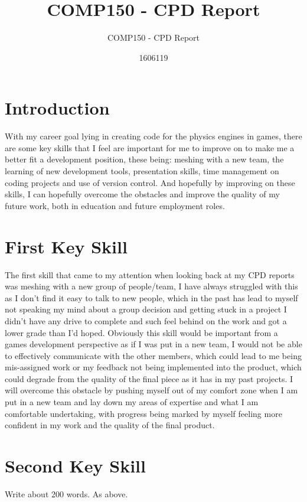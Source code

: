 \documentclass{scrartcl}
\title{COMP150 - CPD Report}
\subtitle{COMP150 - CPD Report}
\author{1606119}
\begin{document}
\maketitle

\section{Introduction}

With my career goal lying in creating code for the physics engines in games, there are some key skills that I feel are important for me to improve on to make me a better fit a development position, these being: meshing with a new team, the learning of new development tools, presentation skills, time management on coding projects and use of version control. And hopefully by improving on these skills, I can hopefully overcome the obstacles and improve the quality of my future work, both in education and future employment roles.
\section{First Key Skill}

The first skill that came to my attention when looking back at my CPD reports was meshing with a new group of people/team, I have always struggled with this as I don't find it easy to talk to new people, which in the past has lead to myself not speaking my mind about a group decision and getting stuck in a project I didn't have any drive to complete and such feel behind on the work and got a lower grade than I'd hoped. Obviously this skill would be important from a games development perspective as if I was put in a new team, I would not be able to effectively communicate with the other members, which could lead to me being mis-assigned work or my feedback not being implemented into the product, which could degrade from the quality of the final piece as it has in my past projects. I will overcome this obstacle by pushing myself out of my comfort zone when I am put in a new team and lay down my areas of expertise and what I am comfortable undertaking, with progress being marked by myself feeling more confident in my work and the quality of the final product. 


\section{Second Key Skill}

Write about 200 words. As above.
\end{document}
